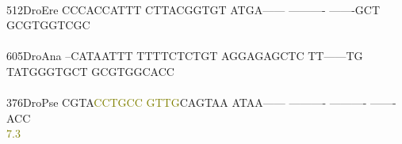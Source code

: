 \documentclass[11pt,twoside,reqno,a4paper]{article}
\begin{document}
{\hspace*{5\charwidth}\hspace*{7\charwidth}\hspace*{1\charwidth}\hspace*{1\charwidth}\hspace*{1\charwidth}\hspace*{1\charwidth}\hspace*{1\charwidth}\hspace*{1\charwidth}\\
512\hspace*{2\charwidth}DroEre	CCCACCATTT	CTTACGGTGT	ATGA------	----------	-------GCT	GCGTGGTCGC	\\
\hspace*{5\charwidth}\hspace*{7\charwidth}\hspace*{1\charwidth}\hspace*{1\charwidth}\hspace*{1\charwidth}\hspace*{1\charwidth}\hspace*{1\charwidth}\hspace*{1\charwidth}\\
605\hspace*{2\charwidth}DroAna	--CATAATTT	TTTTCTCTGT	AGGAGAGCTC	TT------TG	TATGGGTGCT	GCGTGGCACC	\\
\hspace*{5\charwidth}\hspace*{7\charwidth}\hspace*{1\charwidth}\hspace*{1\charwidth}\hspace*{1\charwidth}\hspace*{1\charwidth}\hspace*{1\charwidth}\hspace*{1\charwidth}\\
376\hspace*{2\charwidth}DroPse	CGTA\textcolor{olive}{C}\textcolor{olive}{C}\textcolor{olive}{T}\textcolor{olive}{G}\textcolor{olive}{C}\textcolor{olive}{C}	\textcolor{olive}{G}\textcolor{olive}{T}\textcolor{olive}{T}\textcolor{olive}{G}CAGTAA	ATAA------	----------	----------	-------ACC	\\
\hspace*{5\charwidth}\hspace*{7\charwidth}\hspace*{4\charwidth}\textcolor{olive}{7.3}\hspace*{1\charwidth}\hspace*{1\charwidth}\hspace*{1\charwidth}\hspace*{1\charwidth}\hspace*{1\charwidth}\hspace*{1\charwidth}\\
}
\end{document}
